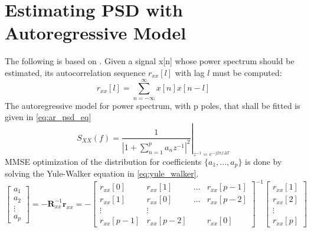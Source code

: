 	\section{Estimating PSD with Autoregressive Model}\label{yule_walker_ar_psd}
	The following is based on \cite{proakis_1993_psd}. Given a signal x[n] whose power spectrum should be estimated, its autocorrelation sequence $r_{xx}[l]$ with lag $l$ must be computed:
	\begin{equation}
		r_{xx}[l] = \sum_{n=-\infty}^{\infty} x[n]x[n-l]
	\end{equation}
	The autoregressive model for power spectrum, with p poles, that shall be fitted is given in \ref{eq:ar_psd_eq}
	\begin{equation}\label{eq:ar_psd_eq}
		S_{XX}(f) = \left.\frac{1}{|1+\sum_{n=1}^pa_nz^{-1}|^2}\right|_{z^{-1}=e^{-j2\pi f\Delta T}}
	\end{equation}
	MMSE optimization of the distribution for coefficients $\{a_1, ..., a_p\}$ is done by solving the Yule-Walker equation in \ref{eq:yule_walker}.
	\begin{equation} \label{eq:yule_walker}
	\begin{bmatrix}
	a_1\\ 
	a_2\\
	\vdots\\
	a_p
	\end{bmatrix} = 
	-\mathbf{R}_{xx}^{-1}\mathbf{r}_{xx}=
	-\begin{bmatrix}
	r_{xx}[0] & r_{xx}[1] & \dots & r_{xx}[p-1]\\ 
	r_{xx}[1] & r_{xx}[0] & \dots & r_{xx}[p-2]\\ 
	\vdots & \vdots &  & \\
	r_{xx}[p-1] & r_{xx}[p-2] &  & r_{xx}[0]
	\end{bmatrix}^{-1}
	\begin{bmatrix}
	r_{xx}[1]\\ 
	r_{xx}[2]\\
	\vdots\\
	r_{xx}[p]
	\end{bmatrix}
	\end{equation}



